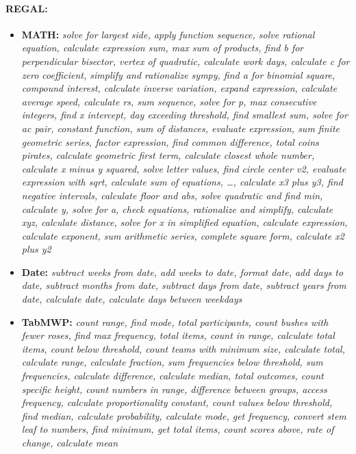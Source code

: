 \paragraph{REGAL:}
\begin{itemize}[noitemsep, topsep=0pt]
    \item \textbf{MATH:}  \textit{solve for largest side, apply function sequence, solve rational equation, calculate expression sum, max sum of products, find b for perpendicular bisector, vertex of quadratic, calculate work days, calculate c for zero coefficient, simplify and rationalize sympy, find a for binomial square, compound interest, calculate inverse variation, expand expression, calculate average speed, calculate rs, sum sequence, solve for p, max consecutive integers, find x intercept, day exceeding threshold, find smallest sum, solve for ac pair, constant function, sum of distances, evaluate expression, sum finite geometric series, factor expression, find common difference, total coins pirates, calculate geometric first term, calculate closest whole number, calculate x minus y squared, solve letter values, find circle center v2, evaluate expression with sqrt, calculate sum of equations, \dots, calculate x3 plus y3, find negative intervals, calculate floor and abs, solve quadratic and find min, calculate y, solve for a, check equations, rationalize and simplify, calculate xyz, calculate distance, solve for x in simplified equation, calculate expression, calculate exponent, sum arithmetic series, complete square form, calculate x2 plus y2
    }

    \item \textbf{Date:}  \textit{subtract weeks from date, add weeks to date, format date, add days to date, subtract months from date, subtract days from date, subtract years from date, calculate date, calculate days between weekdays}

    \item \textbf{TabMWP:}  \textit{count range, find mode, total participants, count bushes with fewer roses, find max frequency, total items, count in range, calculate total items, count below threshold, count teams with minimum size, calculate total, calculate range, calculate fraction, sum frequencies below threshold, sum frequencies, calculate difference, calculate median, total outcomes, count specific height, count numbers in range, difference between groups, access frequency, calculate proportionality constant, count values below threshold, find median, calculate probability, calculate mode, get frequency, convert stem leaf to numbers, find minimum, get total items, count scores above, rate of change, calculate mean}
\end{itemize}



